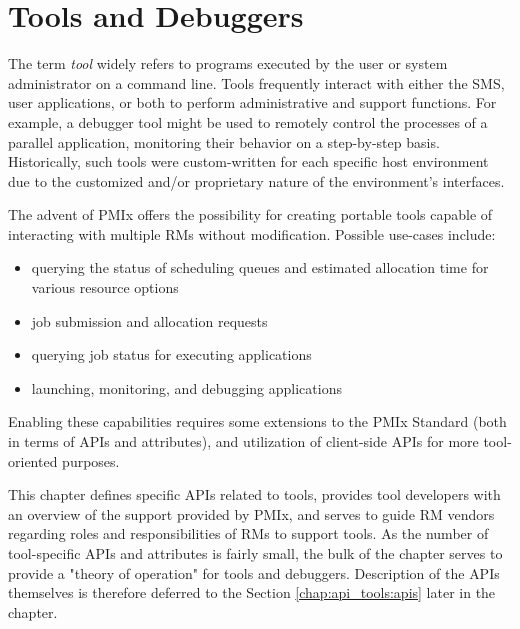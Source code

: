 \chapter{Tools and Debuggers}
\label{chap:api_tools}

The term \textit{tool} widely refers to programs executed by the user or system administrator on a command line. Tools frequently interact with either the \ac{SMS}, user applications, or both to perform administrative and support functions. For example, a debugger tool might be used to remotely control the processes of a parallel application, monitoring their behavior on a step-by-step basis. Historically, such tools were custom-written for each specific host environment due to the customized and/or proprietary nature of the environment's interfaces.

The advent of \ac{PMIx} offers the possibility for creating portable tools capable of interacting with multiple \acp{RM} without modification. Possible use-cases include:

\begin{itemize}
\item querying the status of scheduling queues and estimated allocation time for various resource options
\item job submission and allocation requests
\item querying job status for executing applications
\item launching, monitoring, and debugging applications
\end{itemize}

Enabling these capabilities requires some extensions to the \ac{PMIx} Standard (both in terms of \acp{API} and attributes), and utilization of client-side \acp{API} for more tool-oriented purposes.

This chapter defines specific \acp{API} related to tools, provides tool developers with an overview of the support provided by \ac{PMIx}, and serves to guide \ac{RM} vendors regarding roles and responsibilities of \acp{RM} to support tools. As the number of tool-specific \acp{API} and attributes is fairly small, the bulk of the chapter serves to provide a "theory of operation" for tools and debuggers. Description of the \acp{API} themselves is therefore deferred to the Section \ref{chap:api_tools:apis} later in the chapter.

